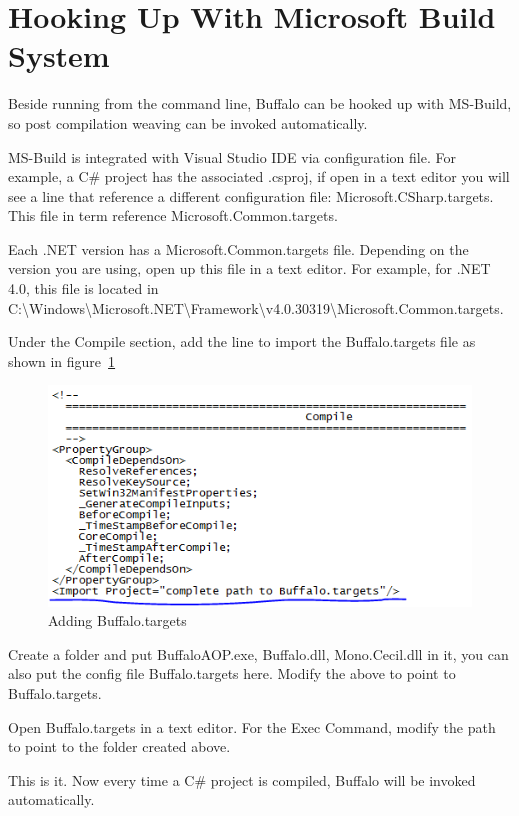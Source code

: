 \section{Hooking Up With Microsoft Build System}

Beside running from the command line, Buffalo can be hooked up with MS-Build, so post compilation weaving can be invoked automatically.

MS-Build is integrated with Visual Studio IDE via configuration file. For example, a C\# project has the associated .csproj, if open in a text editor you will see a line that reference a different configuration file: Microsoft.CSharp.targets. This file in term reference Microsoft.Common.targets.

Each .NET version has a Microsoft.Common.targets file. Depending on the version you are using, open up this file in a text editor. For example, for .NET 4.0, this file is located in C:\textbackslash Windows\textbackslash Microsoft.NET\textbackslash Framework\textbackslash v4.0.30319\textbackslash Microsoft.Common.targets.

Under the Compile section, add the line to import the Buffalo.targets file as shown in figure~\ref{buffalo_targets}

\begin{figure}[H]
  \includegraphics[scale=1.0]{CommonTarget.PNG}
  \centering
  \caption{Adding Buffalo.targets\label{buffalo_targets}}
\end{figure}

Create a folder and put BuffaloAOP.exe, Buffalo.dll, Mono.Cecil.dll in it, you can also put the config file Buffalo.targets here. Modify the above to point to Buffalo.targets.

Open Buffalo.targets in a text editor. For the Exec Command, modify the path to point to the folder created above.

This is it. Now every time a C\# project is compiled, Buffalo will be invoked automatically.
